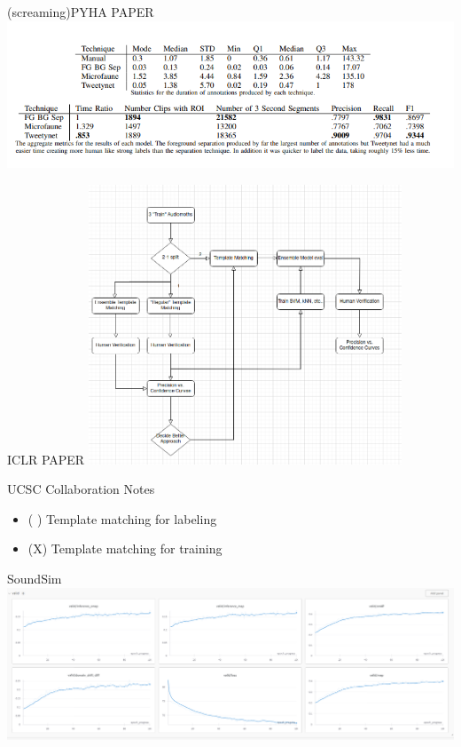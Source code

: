
\begin{frame}{(screaming)PYHA PAPER}
    \centering
    \includegraphics[height=1\textheight,width=1\textwidth,keepaspectratio]{model_performance_01_23.png}
\end{frame}

\begin{frame}{ICLR PAPER}
    \centering
    \includegraphics[height=0.7\textheight,width=0.7\textwidth,keepaspectratio]{ICLR_WORKFLOW.png}
\end{frame}

\begin{frame}{UCSC Collaboration Notes}
    \begin{itemize}
        \item ( ) Template matching for labeling
        \item (X) Template matching for training
    \end{itemize}
\end{frame}

\begin{frame}{SoundSim}
    \centering
    \includegraphics[height=1\textheight,width=1\textwidth,keepaspectratio]{sound_sim_baseline.png}
\end{frame}

